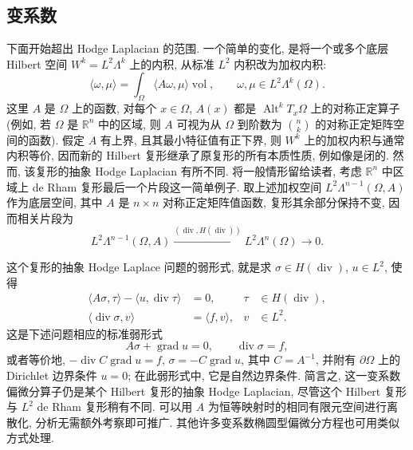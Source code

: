 \subsection{{变系数}}\label{sec:variable-coefficients}

{下面开始超出 Hodge Laplacian 的范围. 一个简单的变化, 是将一个或多个底层 Hilbert 空间 $W^k=L^2\Lambda^k$ 上的内积, 从标准 $L^2$ 内积改为加权内积:}
\[
\langle\omega,\mu\rangle=\int_\Omega\langle A\omega,\mu\rangle\operatorname{vol},\qquad\omega,\mu\in L^2\Lambda^k(\Omega).
\]
{这里 $A$ 是 $\Omega$ 上的函数, 对每个 $x\in\Omega$, $A(x)$ 都是 $\operatorname{Alt}^kT_x\Omega$ 上的对称正定算子 (例如, 若 $\Omega$ 是 $\mathbb R^n$ 中的区域, 则 $A$ 可视为从 $\Omega$ 到阶数为 $\binom nk$ 的对称正定矩阵空间的函数). 假定 $A$ 有上界, 且其最小特征值有正下界, 则 $W^k$ 上的加权内积与通常内积等价, 因而新的 Hilbert 复形继承了原复形的所有本质性质, 例如像是闭的. 然而, 该复形的抽象 Hodge Laplacian 有所不同. 将一般情形留给读者, 考虑 $\mathbb R^n$ 中区域上 de Rham 复形最后一个片段这一简单例子. 取上述加权空间 $L^2\Lambda^{n-1}(\Omega,A)$ 作为底层空间, 其中 $A$ 是 $n\times n$ 对称正定矩阵值函数, 复形其余部分保持不变, 因而相关片段为}
\begin{equation}\label{eq:weighted-divergence-complex}
L^2\Lambda^{n-1}(\Omega,A)\xrightarrow{(\operatorname{div},H(\operatorname{div}))}L^2\Lambda^n(\Omega)\to0.
\end{equation}

{这个复形的抽象 Hodge Laplace 问题的弱形式, 就是求 $\sigma\in H(\operatorname{div})$, $u\in L^2$, 使得}
\[
\begin{aligned}
\langle A\sigma,\tau\rangle-\langle u,\operatorname{div}\tau\rangle&=0,&\tau&\in H(\operatorname{div}),\\
\langle\operatorname{div}\sigma,v\rangle&=\langle f,v\rangle,&v&\in L^2.
\end{aligned}
\]
{这是下述问题相应的标准弱形式}
\[
A\sigma+\operatorname{grad}u=0,\qquad\operatorname{div}\sigma=f,
\]
{或者等价地, $-\operatorname{div}C\operatorname{grad}u=f$, $\sigma=-C\operatorname{grad}u$, 其中 $C=A^{-1}$, 并附有 $\partial\Omega$ 上的 Dirichlet 边界条件 $u=0$; 在此弱形式中, 它是自然边界条件. 简言之, 这一变系数偏微分算子仍是某个 Hilbert 复形的抽象 Hodge Laplacian, 尽管这个 Hilbert 复形与 $L^2$ de Rham 复形稍有不同. 可以用 $A$ 为恒等映射时的相同有限元空间进行离散化, 分析无需额外考察即可推广. 其他许多变系数椭圆型偏微分方程也可用类似方式处理.}
